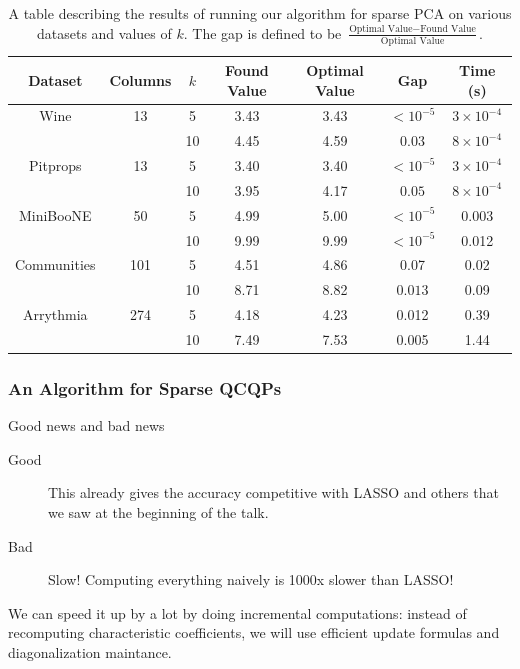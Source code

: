 \documentclass{beamer}
\begin{document}
\begin{frame}
    \tiny{
\begin{table}[H]
\begin{center}
    \begin{tabular}{c|c c c c c c}
        Dataset & Columns & $k$ & Found Value & Optimal Value & Gap & Time (s)\\
        \hline
        Wine & 13 & 5 & 3.43 & 3.43 & $<10^{-5}$ & $3\times 10^{-4}$\\
             &    & 10 & 4.45 & 4.59 & $0.03$ & $8\times 10^{-4}$\\
        \hline
        Pitprops & 13 & 5 & 3.40 & 3.40 & $<10^{-5}$ & $3\times 10^{-4}$\\
             &    & 10 & 3.95 & 4.17 & $0.05$ & $8\times 10^{-4}$\\
        \hline
        MiniBooNE & 50 & 5 & 4.99 & 5.00 & $<10^{-5}$ & 0.003\\
             &    & 10 & 9.99 & 9.99 & $<10^{-5}$ & 0.012\\
        \hline
        Communities & 101 & 5 & 4.51 & 4.86 & 0.07 & 0.02 \\
             &    & 10 & 8.71 & 8.82 & $0.013$ & 0.09\\
        \hline
        Arrythmia & 274 & 5 & 4.18 & 4.23 & 0.012 & 0.39\\
         & & 10 & 7.49 & 7.53 & 0.005 & 1.44
    \end{tabular}

\end{center}
\caption{A table describing the results of running our algorithm for sparse PCA on various datasets and values of $k$.  The gap is defined to be $\frac{\text{Optimal Value} - \text{Found Value}}{\text{Optimal Value}}$.}
\end{table}}
\end{frame}
\begin{frame}
    \frametitle{An Algorithm for Sparse QCQPs}
    Good news and bad news
    \begin{description}
        \item[Good] This already gives the accuracy competitive with LASSO and others that we saw at the beginning of the talk.
        \pause
        \item[Bad] Slow! Computing everything naively is 1000x slower than LASSO!
    \end{description}

    \pause
    We can speed it up by a lot by doing incremental computations: instead of recomputing characteristic coefficients, we will use efficient update formulas and diagonalization maintance.
\end{frame}
\end{document}
